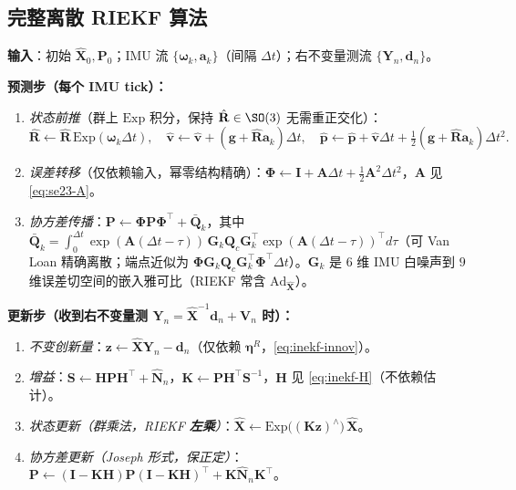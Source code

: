 \subsection{完整离散 RIEKF 算法}
\label{subsec:riekf-algo}

\begin{algo}
\label{algo:riekf}
\textbf{输入}：初始 $\hat{\mathbf{X}}_0,\mathbf{P}_0$；IMU 流 $\{\boldsymbol{\omega}_k,\mathbf{a}_k\}$（间隔 $\Delta t$）；右不变量测流 $\{\mathbf{Y}_n,\mathbf{d}_n\}$。\par
\medskip
\textbf{预测步（每个 IMU tick）：}
\begin{enumerate}
  \item \emph{状态前推}（群上 $\mathrm{Exp}$ 积分，保持 $\hat{\mathbf{R}}\in\SO(3)$ 无需重正交化）：
  \[
    \hat{\mathbf{R}}\leftarrow\hat{\mathbf{R}}\,\mathrm{Exp}(\boldsymbol{\omega}_k\Delta t),\quad
    \hat{\mathbf{v}}\leftarrow\hat{\mathbf{v}}+(\mathbf{g}+\hat{\mathbf{R}}\mathbf{a}_k)\Delta t,\quad
    \hat{\mathbf{p}}\leftarrow\hat{\mathbf{p}}+\hat{\mathbf{v}}\Delta t+\tfrac12(\mathbf{g}+\hat{\mathbf{R}}\mathbf{a}_k)\Delta t^2.
  \]
  \item \emph{误差转移}（仅依赖输入，幂零结构精确）：$\boldsymbol{\Phi}\leftarrow\mathbf{I}+\mathbf{A}\Delta t+\tfrac12\mathbf{A}^2\Delta t^2$，$\mathbf{A}$ 见 \cref{eq:se23-A}。
  \item \emph{协方差传播}：$\mathbf{P}\leftarrow\boldsymbol{\Phi}\mathbf{P}\boldsymbol{\Phi}^\top+\bar{\mathbf{Q}}_k$，其中 $\bar{\mathbf{Q}}_k=\int_0^{\Delta t}\!\exp(\mathbf{A}(\Delta t-\tau))\,\mathbf{G}_k\mathbf{Q}_c\mathbf{G}_k^\top\exp(\mathbf{A}(\Delta t-\tau))^\top d\tau$（可 Van Loan 精确离散；端点近似为 $\boldsymbol{\Phi}\mathbf{G}_k\mathbf{Q}_c\mathbf{G}_k^\top\boldsymbol{\Phi}^\top\Delta t$）。$\mathbf{G}_k$ 是 $6$ 维 IMU 白噪声到 $9$ 维误差切空间的嵌入雅可比（RIEKF 常含 $\mathrm{Ad}_{\hat{\mathbf{X}}}$）。
\end{enumerate}
\textbf{更新步（收到右不变量测 $\mathbf{Y}_n=\hat{\mathbf{X}}^{-1}\mathbf{d}_n+\mathbf{V}_n$ 时）：}
\begin{enumerate}
  \item \emph{不变创新量}：$\mathbf{z}\leftarrow\hat{\mathbf{X}}\mathbf{Y}_n-\mathbf{d}_n$（仅依赖 $\boldsymbol{\eta}^R$，\cref{eq:inekf-innov}）。
  \item \emph{增益}：$\mathbf{S}\leftarrow\mathbf{H}\mathbf{P}\mathbf{H}^\top+\hat{\mathbf{N}}_n$，$\mathbf{K}\leftarrow\mathbf{P}\mathbf{H}^\top\mathbf{S}^{-1}$，$\mathbf{H}$ 见 \cref{eq:inekf-H}（不依赖估计）。
  \item \emph{状态更新（群乘法，RIEKF \textbf{左乘}）}：$\hat{\mathbf{X}}\leftarrow\mathrm{Exp}\big((\mathbf{K}\mathbf{z})^\wedge\big)\,\hat{\mathbf{X}}$。
  \item \emph{协方差更新（Joseph 形式，保正定）}：$\mathbf{P}\leftarrow(\mathbf{I}-\mathbf{K}\mathbf{H})\mathbf{P}(\mathbf{I}-\mathbf{K}\mathbf{H})^\top+\mathbf{K}\hat{\mathbf{N}}_n\mathbf{K}^\top$。
\end{enumerate}
\end{algo}

